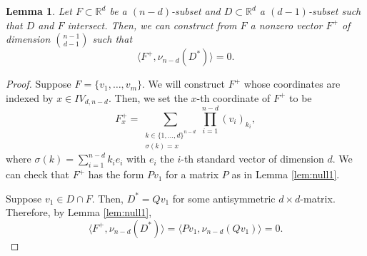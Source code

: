 \documentclass{article}
\newtheorem{lem}[thm]{Lemma}
\begin{document}
    \begin{lem}\label{lem:null2}
    	Let $F \subset \mathbb{R}^d$ be a $(n-d)$-subset and $D \subset \mathbb{R}^d$ a $(d-1)$-subset such that $D$ and $F$ intersect. Then, we can construct from $F$ a nonzero vector $F^+$ of dimension $\binom{n-1}{d-1}$ such that 
        \begin{equation}\label{eq:null2}
        	\langle F^+, \nu_{n-d}(D^*) \rangle = 0.
        \end{equation}
    \end{lem}
    \begin{proof}
    	Suppose $F = \{v_1, \dots, v_m\}$. We will construct $F^+$ whose coordinates are indexed by $x \in IV_{d,n-d}$. Then, we set the $x$-th coordinate of $F^+$ to be
        \begin{equation}
        	F^+_x = \sum_{\substack{k \in \{1,\dots,d\}^{n-d} \\ \sigma(k) = x}} \prod_{i=1}^{n-d} (v_i)_{k_i},
        \end{equation}
        where $\sigma(k) = \sum_{i=1}^{n-d} k_i e_i$ with $e_i$ the $i$-th standard vector of dimension $d$. We can check that $F^+$ has the form $Pv_1$ for a matrix $P$ as in Lemma \ref{lem:null1}.
        
        Suppose $v_1 \in D \cap F$. Then, $D^* = Qv_1$ for some antisymmetric $d \times d$-matrix. Therefore, by Lemma \ref{lem:null1},
		\begin{equation}
			\langle F^+, \nu_{n-d}(D^*) \rangle = \langle Pv_1, \nu_{n-d}(Qv_1)  \rangle = 0.
		\end{equation}        
    \end{proof}



\end{document}
